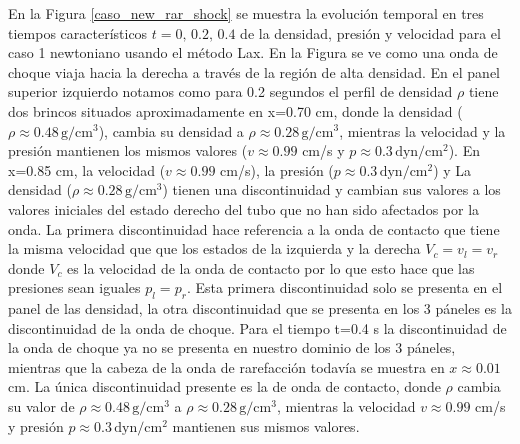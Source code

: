 \documentclass[12pt,a4paper]{book}
\begin{document}
En la Figura \ref{caso_new_rar_shock} se muestra la evolución temporal en tres 
tiempos característicos $t = 0, \, 0.2, \, 0.4$
de la densidad, 
presión y velocidad para el caso 1 newtoniano usando el método Lax. En la Figura se ve como 
una onda de choque viaja hacia la derecha a través de la región de alta densidad.
En el panel superior izquierdo
notamos como para 0.2 segundos el perfil de densidad $\rho$ tiene dos brincos situados 
aproximadamente en 
x=0.70 cm, donde la densidad ($\rho \approx 0.48 \,  \text{g}/ \text{cm}^3$), 
cambia su densidad a $\rho \approx 0.28 \,  \text{g}/ \text{cm}^3$, mientras la velocidad y la presión 
mantienen los mismos valores 
($v \approx 0.99$ cm/s y $p \approx 0.3 \,  \text{dyn}/ \text{cm}^2 $).
En x=0.85 cm, la velocidad ($v \approx 0.99$ cm/s), la presión 
($p \approx 0.3  \,  \text{dyn}/ \text{cm}^2 $)  y La densidad 
($\rho \approx 0.28 \,  \text{g}/ \text{cm}^3$) 
tienen una discontinuidad y cambian sus valores a los valores iniciales del estado derecho del tubo
que no han sido afectados por la onda. 
La primera discontinuidad hace referencia a la onda de contacto que tiene la misma velocidad
que que los estados de la izquierda y la derecha $V_c = v_l = v_r$ donde $V_c$
es la velocidad de la onda de contacto por lo que esto hace que las presiones sean iguales 
$p_l = p_r$. Esta primera discontinuidad solo se 
presenta en el panel de las densidad, la otra discontinuidad que se presenta en los 3 páneles es la 
discontinuidad de la onda de choque.
Para el tiempo t=0.4 s
la discontinuidad de la onda de choque ya no se presenta en nuestro dominio de los 3 páneles, mientras 
que la cabeza de la onda de rarefacción todavía se muestra en $x \approx 0.01$ cm. La única discontinuidad 
presente es la de onda de 
contacto, donde $\rho$ cambia su valor de $\rho \approx 0.48 \,  \text{g}/ \text{cm}^3$
a $\rho \approx 0.28 \,  \text{g}/ \text{cm}^3$, mientras la velocidad $v \approx 0.99$ cm/s y 
presión $p \approx 0.3 \,  \text{dyn}/ \text{cm}^2 $ mantienen
sus mismos valores.
\end{document}
